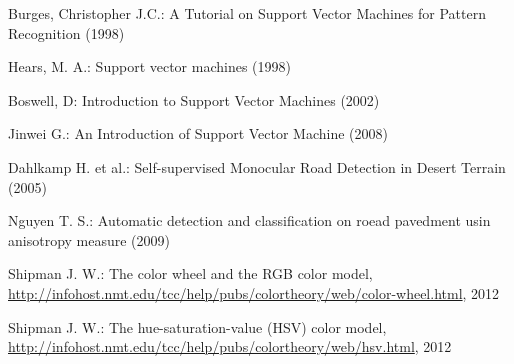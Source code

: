 %
%
\clearpage
\begin{thebibliography}{8}
%
Burges, Christopher J.C.:
A Tutorial on Support Vector Machines for Pattern
Recognition (1998)

Hears, M. A.:
Support vector machines (1998)


Boswell, D:
Introduction to Support Vector Machines (2002)

Jinwei G.:
An Introduction of Support Vector Machine (2008)

Dahlkamp H. et al.:
Self-supervised Monocular Road Detection in
Desert Terrain (2005)

Nguyen T. S.: Automatic detection and classification on roead pavedment usin anisotropy measure (2009)

Shipman J. W.: The color wheel and the RGB color model, \url{http://infohost.nmt.edu/tcc/help/pubs/colortheory/web/color-wheel.html}, 2012

Shipman J. W.: The hue-saturation-value (HSV) color model, \url{http://infohost.nmt.edu/tcc/help/pubs/colortheory/web/hsv.html}, 2012
\end{thebibliography}

\clearpage